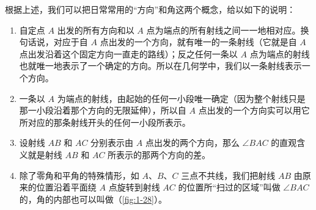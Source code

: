 根据上述，我们可以把日常常用的“方向”和角这两个概念，给以如下的说明：
\begin{enumerate}
	\item 自定点 $A$ 出发的所有方向和以 $A$ 点为端点的所有射线之间一一地相对应。换句话说，对应于自 $A$ 点出发的一个方向，就有唯一的一条射线（它就是自 $A$ 点出发沿着这个固定方向一直走的路线）；反之任何一条以 $A$ 点为端点的射线也就唯一地表示了一个确定的方向。所以在几何学中，我们以一条射线表示一个方向。
	\item 一条以 $A$ 为端点的射线，由起始的任何一小段唯一确定（因为整个射线只是那一小段沿着那个方向的无限延伸），所以自 $A$ 点出发的一个方向实可以用它所对应的那条射线开头的任何一小段所表示。
	\item 设射线 $AB$ 和 $AC$ 分别表示由 $A$ 点出发的两个方向，那么 $\angle BAC$ 的直观含义就是射线 $AB$ 和 $AC$ 所表示的那两个方向的差。
	\item 除了零角和平角的特殊情形，如 $A$、$B$、$C$ 三点不共线，我们把射线 $AB$ 由原来的位置沿着平面绕 $A$ 点旋转到射线 $AC$ 的位置所“扫过的区域”叫做 $\angle BAC$ 的，角的内部也可以叫做（\cref{fig:1-28}）。
\end{enumerate}

